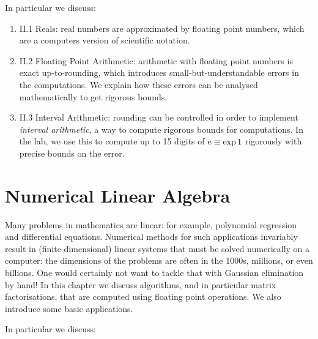 \documentclass[12pt,a4paper]{book}
\theoremstyle{definition}
\begin{document}
In particular we discuss:

\begin{enumerate}
\item II.1 Reals:  real numbers are approximated by floating point numbers, which are a computers version of scientific notation.
\item II.2 Floating Point Arithmetic:  arithmetic with floating point numbers is exact up-to-rounding, which introduces small-but-understandable errors in the computations. We explain how these errors can be analysed mathematically to get rigorous bounds.
\item II.3 Interval Arithmetic: rounding can be controlled in order to implement {\it interval arithmetic}, a way to compute rigorous bounds for computations. In the lab, we use this to compute up to 15 digits of ${\rm e} \equiv \exp 1$ rigorously with precise bounds on the error.
\end{enumerate}







\chapter{Numerical Linear Algebra}

Many problems in mathematics are linear: for example, polynomial regression and
differential equations. Numerical methods for such applications invariably result
in (finite-dimensional) linear systems that must be solved numerically on a computer:
the dimensions of the problems are often in the 1000s, millions, or even billions.
One would certainly not want to tackle that with Gaussian elimination by hand!
In this chapter we discuss algorithms, and in particular matrix factorisations, that are
computed using floating point operations. We also introduce some basic applications.



In particular we discuss:
\end{document}
